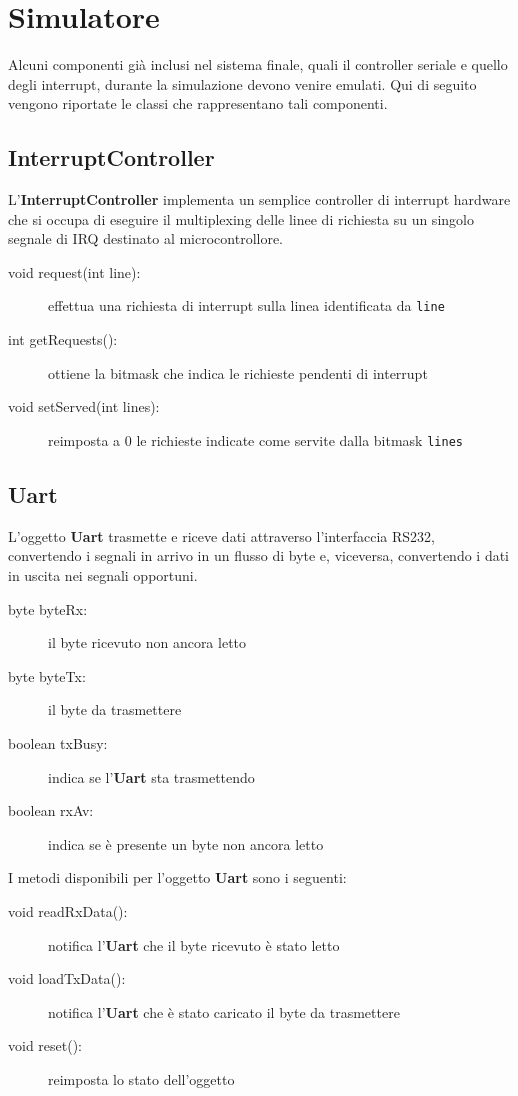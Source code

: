 \documentclass [11pt,a4paper,oneside]{paper}
\newcommand{\component}[1]{\textbf{#1}}
\newcommand{\identifier}[1]{\texttt{#1}}
\begin{document}
\section{Simulatore}
Alcuni componenti già inclusi nel sistema finale, quali il controller
seriale e quello degli interrupt, durante la simulazione devono venire
emulati. Qui di seguito vengono riportate le classi che rappresentano
tali componenti.

\subsection{InterruptController}
L'\component{InterruptController} implementa un semplice controller di
interrupt hardware che si occupa di eseguire il multiplexing delle
linee di richiesta su un singolo segnale di IRQ destinato al
microcontrollore.

\begin{description}
\item[void request(int line):] effettua una richiesta di interrupt sulla
    linea identificata da \identifier{line}
\item[int getRequests():] ottiene la bitmask che indica le richieste pendenti
    di interrupt
\item[void setServed(int lines):] reimposta a 0 le richieste indicate come servite
    dalla bitmask \identifier{lines}
\end{description}

\subsection{Uart}
L'oggetto \component{Uart} trasmette e riceve dati attraverso l'interfaccia RS232,
convertendo i segnali in arrivo in un flusso di byte e, viceversa, convertendo
i dati in uscita nei segnali opportuni.

\begin{description}
\item[byte byteRx:] il byte ricevuto non ancora letto
\item[byte byteTx:] il byte da trasmettere
\item[boolean txBusy:] indica se l'\component{Uart} sta trasmettendo
\item[boolean rxAv:] indica se è presente un byte non ancora letto
\end{description}

I metodi disponibili per l'oggetto \component{Uart} sono i seguenti:

\begin{description}
\item[void readRxData():] notifica l'\component{Uart} che il byte ricevuto è
    stato letto
\item[void loadTxData():] notifica l'\component{Uart} che è stato caricato il
    byte da trasmettere
\item[void reset():] reimposta lo stato dell'oggetto
\end{description}
\end{document}

